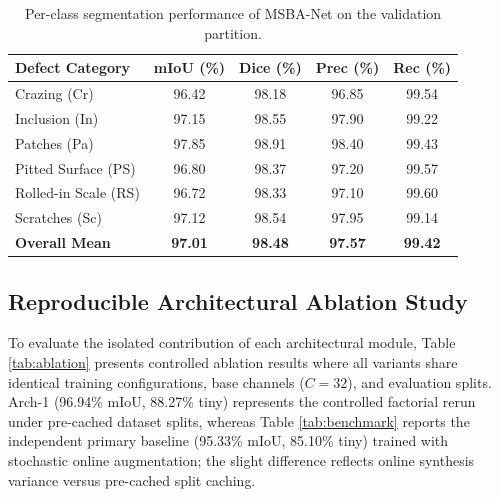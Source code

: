 \documentclass{ieeeaccess}
\begin{document}
\begin{table}[!t]
\centering
\setlength{\tabcolsep}{3.5pt}
\fontsize{7.5pt}{9.5pt}\selectfont
\caption{Per-class segmentation performance of MSBA-Net on the validation partition.}
\label{tab:classwise}
\begin{tabular*}{\columnwidth}{@{\extracolsep{\fill}}lcccc@{}}
\toprule
\textbf{Defect Category} & \textbf{mIoU (\%)} & \textbf{Dice (\%)} & \textbf{Prec (\%)} & \textbf{Rec (\%)} \\
\midrule
Crazing (Cr) & 96.42 & 98.18 & 96.85 & 99.54 \\
Inclusion (In) & 97.15 & 98.55 & 97.90 & 99.22 \\
Patches (Pa) & 97.85 & 98.91 & 98.40 & 99.43 \\
Pitted Surface (PS) & 96.80 & 98.37 & 97.20 & 99.57 \\
Rolled-in Scale (RS) & 96.72 & 98.33 & 97.10 & 99.60 \\
Scratches (Sc) & 97.12 & 98.54 & 97.95 & 99.14 \\
\midrule
\textbf{Overall Mean} & \textbf{97.01} & \textbf{98.48} & \textbf{97.57} & \textbf{99.42} \\
\bottomrule
\end{tabular*}
\end{table}

\subsection{Reproducible Architectural Ablation Study}
To evaluate the isolated contribution of each architectural module, Table \ref{tab:ablation} presents controlled ablation results where all variants share identical training configurations, base channels ($C=32$), and evaluation splits. Arch-1 (96.94\% mIoU, 88.27\% tiny) represents the controlled factorial rerun under pre-cached dataset splits, whereas Table \ref{tab:benchmark} reports the independent primary baseline (95.33\% mIoU, 85.10\% tiny) trained with stochastic online augmentation; the slight difference reflects online synthesis variance versus pre-cached split caching.
\end{document}
